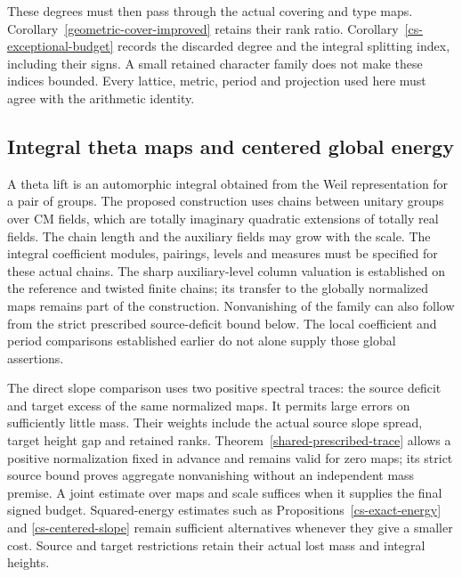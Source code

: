 These degrees must then pass through the actual covering and type
maps. Corollary~\ref{geometric-cover-improved} retains their rank ratio.
Corollary~\ref{cs-exceptional-budget} records the discarded degree
and the integral splitting index, including their signs. A small
retained character family does not make these indices bounded.
Every lattice, metric, period and projection used here must agree
with the arithmetic identity.

\subsection{Integral theta maps and centered global energy}

A theta lift is an automorphic integral obtained from the Weil
representation for a pair of groups. The proposed construction uses
chains between unitary groups over CM fields, which are totally
imaginary quadratic extensions of totally real fields. The chain
length and the auxiliary fields may grow with the scale.
The integral coefficient modules, pairings, levels and measures must
be specified for these actual chains. The sharp auxiliary-level column
valuation is established on the reference and twisted finite chains;
its transfer to the globally normalized maps remains part of the
construction. Nonvanishing of the family can also
follow from the strict prescribed source-deficit bound below.
The local coefficient and period comparisons established earlier do
not alone supply those global assertions.

The direct slope comparison uses two positive spectral traces: the
source deficit and target excess of the same normalized maps. It permits
large errors on sufficiently little mass. Their weights include the
actual source slope spread, target height gap and retained ranks.
Theorem~\ref{shared-prescribed-trace} allows a positive normalization
fixed in advance and remains valid for zero maps; its strict source
bound proves aggregate nonvanishing without an independent mass premise.
A joint estimate over maps and scale suffices when it supplies the final
signed budget. Squared-energy estimates such as
Propositions~\ref{cs-exact-energy} and \ref{cs-centered-slope} remain
sufficient alternatives whenever they give a smaller cost. Source and
target restrictions retain their actual lost mass and integral heights.

